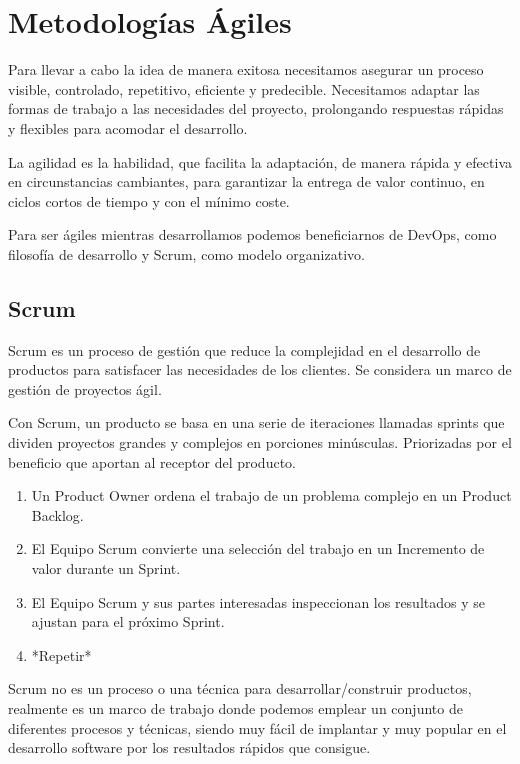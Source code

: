 \documentclass[12pt,twoside,titlepage]{report}
\begin{document}
\chapter{Metodologías Ágiles}

Para llevar a cabo la idea de manera exitosa necesitamos asegurar un proceso visible, controlado, repetitivo, eficiente y predecible. Necesitamos adaptar las formas de trabajo a las necesidades del proyecto, prolongando respuestas rápidas y flexibles para acomodar el desarrollo.

La agilidad es la habilidad, que facilita la adaptación, de manera rápida y efectiva en circunstancias cambiantes, para garantizar la entrega de valor continuo, en ciclos cortos de tiempo y con el mínimo coste.

Para ser ágiles mientras desarrollamos podemos beneficiarnos de DevOps, como filosofía de desarrollo y Scrum, como modelo organizativo.

\section{Scrum}

Scrum es un proceso de gestión que reduce la complejidad en el desarrollo de productos para satisfacer las necesidades de los clientes. Se considera un marco de gestión de proyectos ágil.

Con Scrum, un producto se basa en una serie de iteraciones llamadas sprints que dividen proyectos grandes y complejos en porciones minúsculas. Priorizadas por el beneficio que aportan al receptor del producto.

\begin{enumerate}
    \item Un Product Owner ordena el trabajo de un problema complejo en un Product Backlog.
    \item El Equipo Scrum convierte una selección del trabajo en un Incremento de valor durante un Sprint.
    \item El Equipo Scrum y sus partes interesadas inspeccionan los resultados y se ajustan para el próximo Sprint.
    \item *Repetir*
\end{enumerate}

Scrum no es un proceso o una técnica para desarrollar/construir productos, realmente es un marco de trabajo donde podemos emplear un conjunto de diferentes procesos y técnicas, siendo muy fácil de implantar y muy popular en el desarrollo software por los resultados rápidos que consigue.
\end{document}
